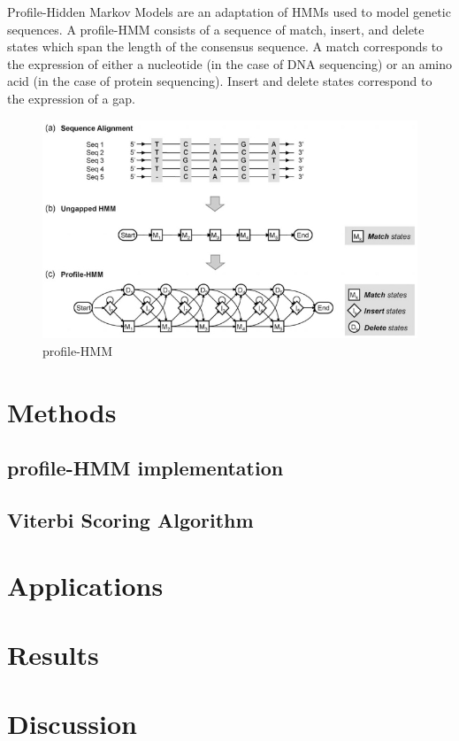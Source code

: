 \documentclass{article}
\begin{document}
Profile-Hidden Markov Models are an adaptation of HMMs used to model genetic sequences. A profile-HMM consists of a sequence of match, insert, and delete states which span the length of the consensus sequence. A match corresponds to the expression of either a nucleotide (in the case of DNA sequencing) or an amino acid (in the case of protein sequencing). Insert and delete states correspond to the expression of a gap. 
\begin{figure}[H]
\centering
\includegraphics[width=.8\textwidth]{materials/profile-HMM.png}
\caption{profile-HMM\footnotemark[1]}
\end{figure}

\section{Methods}

\subsection{profile-HMM implementation}

\subsection{Viterbi Scoring Algorithm}

\section{Applications}

\section{Results}

\section{Discussion}


% 
% 
% 



% 
\end{document}
